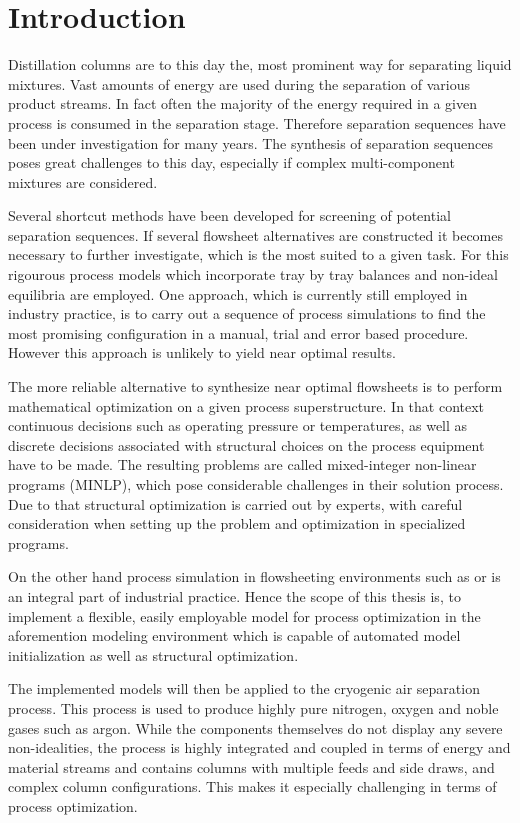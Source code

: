 \chapter{Introduction}
\label{chp:intro}
Distillation columns are to this day the, most prominent way for separating liquid mixtures. Vast amounts of energy
are used during the separation of various product streams. In fact often the majority of the energy required in
a given process is consumed in the separation stage. Therefore separation sequences have been under investigation
for many years. The synthesis of separation sequences poses great challenges to this day, especially if complex
multi-component mixtures are considered.

Several shortcut methods have been developed for screening of potential separation sequences. If several
flowsheet alternatives are constructed it becomes necessary to further investigate, which is the most
suited to a given task. For this rigourous process models which incorporate tray by tray balances and
non-ideal equilibria are employed. One approach, which is currently still employed in industry practice,
is to carry out a sequence of process simulations to find the most promising configuration in a manual, trial
and error based procedure. However this approach is unlikely to yield near optimal results.

The more reliable alternative to synthesize near optimal flowsheets is to perform mathematical optimization
on a given process superstructure. In that context continuous decisions such as operating pressure or temperatures,
as well as discrete decisions associated with structural choices on the process equipment have to be made. The
resulting problems are called mixed-integer non-linear programs (MINLP), which pose considerable challenges
in their solution process. Due to that structural optimization is carried out by experts, with careful consideration
when setting up the problem and optimization in specialized programs.

On the other hand process simulation in flowsheeting environments such as \aspen or \gproms is an integral
part of industrial practice. Hence the scope of this thesis is, to implement a flexible, easily employable
model for process optimization in the aforemention modeling environment \gproms which is capable of
automated model initialization as well as structural optimization.

The implemented models will then be applied to the cryogenic air separation process. This process is used to
produce highly pure nitrogen, oxygen and noble gases such as argon. While the components themselves
do not display any severe non-idealities, the process is highly integrated and coupled in terms of energy
and material streams and contains columns with multiple feeds and side draws, and complex column configurations.
This makes it especially challenging in terms of process optimization.

